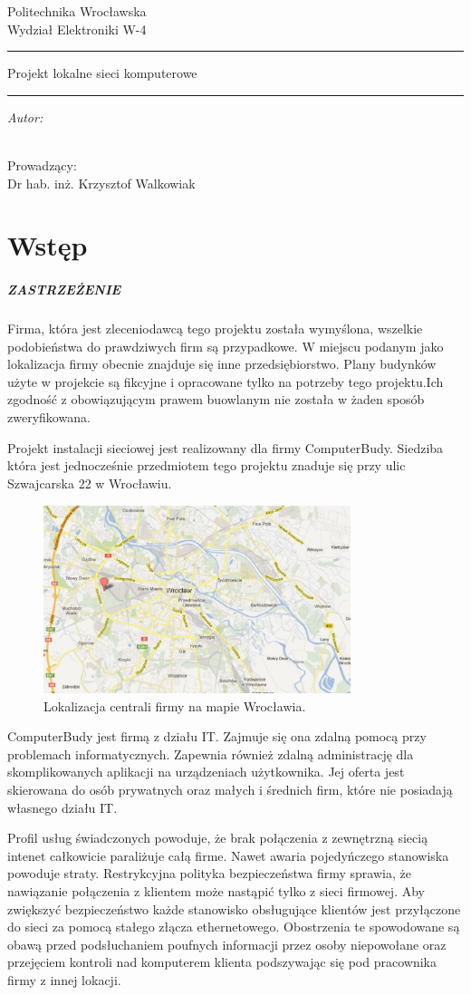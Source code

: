 \documentclass{report}
\author{Mateusz Socha 181308 \\ Janusz Kuszczyński 184872 }
\title{}
\makeatletter
\newcommand{\linia}{\rule{\linewidth}{0.4mm}}
\renewcommand{\maketitle}{\begin{titlepage}

    \vspace*{1cm}

    \begin{center}\small

    Politechnika Wrocławska\\

    Wydział Elektroniki W-4\\

    \end{center}

    \vspace{3cm}

    \noindent\linia

    \begin{center}

      \LARGE Projekt lokalne sieci komputerowe\\
      \normalsize\textsc{\@title}

         \end{center}

     \noindent\linia

    \vspace{0.5cm}

    \begin{flushright}

    \begin{minipage}{6cm}

    \textit{\small Autor:}\\

    \normalsize \textsc{\@author} \\

    \end{minipage}

    \vspace{5cm}

     {\small Prowadzący:}\\

         Dr hab. inż. Krzysztof Walkowiak

     \end{flushright}

    \vspace*{\stretch{6}}

    \begin{center}

    \@date

    \end{center}

  \end{titlepage}

}
\makeatother
\begin{document}
\maketitle
\tableofcontents

\chapter{Wstęp}
\paragraph{ZASTRZEŻENIE}
Firma, która jest zleceniodawcą tego projektu została wymyślona, wszelkie podobieństwa do prawdziwych firm są przypadkowe.
W miejscu podanym jako lokalizacja firmy obecnie znajduje się inne przedsiębiorstwo. Plany budynków użyte w projekcie są fikcyjne i opracowane tylko na 
potrzeby tego projektu.Ich zgodność z obowiązującym prawem buowlanym nie została w żaden sposób zweryfikowana.

\vspace{0,5cm}
Projekt instalacji sieciowej jest realizowany dla firmy ComputerBudy. Siedziba która jest jednocześnie przedmiotem tego projektu znaduje się
przy ulic Szwajcarska 22 w Wrocławiu.

\begin{figure}[h!]
  \centering
      \includegraphics[width=0.8\textwidth]{./obrazki/adres_computerbudy.jpeg}
  \caption{Lokalizacja centrali firmy na mapie Wrocławia.}
\end{figure}

ComputerBudy jest firmą z działu IT. Zajmuje się ona zdalną pomocą przy problemach informatycznych. Zapewnia również zdalną administrację dla
skomplikowanych aplikacji na urządzeniach użytkownika. Jej oferta jest skierowana do osób prywatnych oraz małych i średnich firm, które
nie posiadają własnego działu IT.

Profil usług świadczonych powoduje, że brak połączenia z zewnętrzną siecią intenet całkowicie paraliżuje całą firme. 
Nawet awaria pojedyńczego stanowiska powoduje straty. Restrykcyjna polityka bezpieczeństwa firmy sprawia, że nawiązanie połączenia z klientem
może nastąpić tylko z sieci firmowej. Aby zwiększyć bezpieczeństwo każde stanowisko obsługujące klientów jest przyłączone do sieci
za pomocą stałego złącza ethernetowego. Obostrzenia te spowodowane są obawą przed podsłuchaniem poufnych informacji przez osoby niepowołane oraz
przejęciem kontroli nad komputerem klienta podszywając się pod pracownika firmy z innej lokacji.
\end{document}
